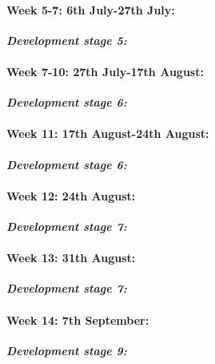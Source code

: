 \documentclass[a4paper, 11pt]{article}
\begin{document}
\paragraph{\textbf{Week 5-7: 6th July-27th July:}} \textbf{\emph{Development stage 5: }}




\paragraph{\textbf{Week 7-10: 27th July-17th August:}} \textbf{\emph{Development stage 6: }}



\paragraph{\textbf{Week 11: 17th August-24th August:	}} \textbf{\emph{Development stage 6: }}

\paragraph{\textbf{Week 12: 24th August:	}} \textbf{\emph{Development stage 7: }}

\paragraph{\textbf{Week 13: 31th August:	}} \textbf{\emph{Development stage 7: }}

\paragraph{\textbf{Week 14: 7th September:	}} \textbf{\emph{Development stage 9: }}
\end{document}
